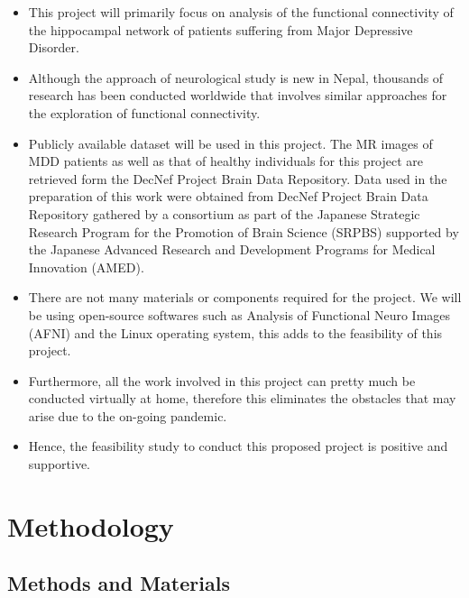 \documentclass[12pt]{article}
\begin{document}
\begin{itemize}

  \item This project will primarily focus on analysis of the
    functional connectivity of the hippocampal network of patients
    suffering from Major Depressive Disorder.

  \item  Although the approach of neurological study is new in Nepal,
    thousands of research has been conducted worldwide that involves
    similar approaches for the exploration of functional connectivity.

  \item Publicly available dataset will be used in this project. The
    MR images of MDD patients as well as that of healthy individuals
    for this project are retrieved form the DecNef Project Brain Data
    Repository. Data used in the preparation of this work were
    obtained from DecNef Project Brain Data Repository gathered by
    a consortium as part of the Japanese Strategic Research Program
    for the Promotion of Brain Science (SRPBS) supported by the
    Japanese Advanced Research and Development Programs for Medical
    Innovation (AMED). \textcite{dataset}

  \item There are not many materials or components required for the
    project. We will be using open-source softwares such as Analysis
    of Functional Neuro Images (AFNI) and the Linux operating system,
    this adds to the feasibility of this project.

  \item Furthermore, all the work involved in this project can pretty
    much be conducted virtually at home, therefore this eliminates the
    obstacles that may arise due to the on-going pandemic.

  \item Hence, the feasibility study to conduct this proposed project
    is positive and supportive.

\end{itemize}
\newpage

\section{Methodology}

\subsection{Methods and Materials}
\end{document}
